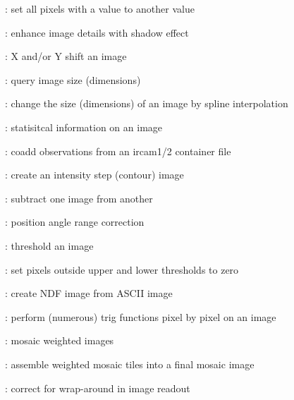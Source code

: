 \begin{description}
\item []: set all pixels with a value to another value

\item []: enhance image details with shadow effect

\item []: X and/or Y shift an image

\item []: query image size (dimensions)

\item []: change the size (dimensions) of an
image by spline interpolation

\item []: statisitcal information on an image

\item []: coadd observations from an {\sc
ircam1/2} container file

\item []: create an intensity step (contour) image

\item []: subtract one image from another

\item []: position angle range correction

\item []: threshold an image

\item []: set pixels outside upper and lower
thresholds to zero

\item []: create NDF image from ASCII image

\item []: perform (numerous) trig functions pixel
by pixel on an image

\item []: mosaic weighted images

\item []: assemble weighted mosaic tiles into a
final mosaic image

\item []: correct for wrap-around in image readout


\end{description}
